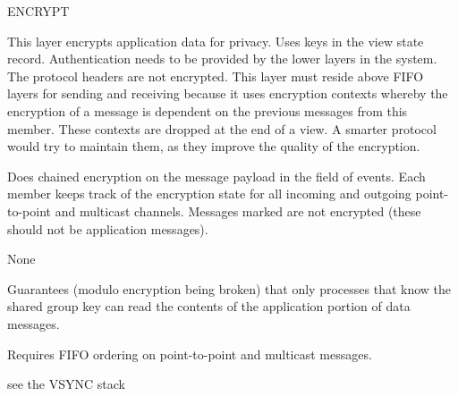 %
%
%
\begin{Layer}{ENCRYPT}

This layer encrypts application data for privacy.  Uses keys in the view state
record.  Authentication needs to be provided by the lower layers in the system.
The protocol headers are not encrypted.  This layer must reside above FIFO
layers for sending and receiving because it uses encryption contexts whereby
the encryption of a message is dependent on the previous messages from this
member.  These contexts are dropped at the end of a view.  A smarter protocol
would try to maintain them, as they improve the quality of the encryption.

\begin{Protocol}
Does chained encryption on the message payload in the  field of
events.  Each member keeps track of the encryption state for all incoming and
outgoing point-to-point and multicast channels.  Messages marked
 are not encrypted (these should not be application
messages).
\end{Protocol}

\begin{Parameters}
\item None
\end{Parameters}

\begin{Properties}
\item
Guarantees (modulo encryption being broken) that only processes that know the
shared group key can read the contents of the application portion of data
messages.
\item
Requires FIFO ordering on point-to-point and multicast messages.
\end{Properties}

\begin{Sources}
\end{Sources}

\begin{GenEvent}
\end{GenEvent}

\begin{Testing}
\item
see the VSYNC stack
\end{Testing}
\end{Layer}
